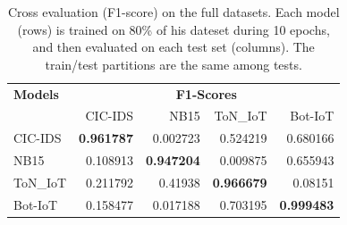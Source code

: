 \begin{table}[]
%
    \centering
    \begin{tabular}{l|rrrr}
        \toprule %
        \textbf{Models} & \multicolumn{4}{c}{\textbf{F1-Scores}} \\
                        & CIC-IDS & NB15 & ToN\_IoT & Bot-IoT \\
        \midrule %
          CIC-IDS & \textbf{0.961787} &    0.002723 &  0.524219 &  0.680166 \\
          NB15 & 0.108913 &    \textbf{0.947204} &  0.009875 &  0.655943 \\
          ToN\_IoT & 0.211792 &     0.41938 &  \textbf{0.966679} &   0.08151 \\
          Bot-IoT & 0.158477 &    0.017188 &  0.703195 &  \textbf{0.999483} \\
        \bottomrule %
    \end{tabular}
    \bigskip
    \caption{Cross evaluation (F1-score) on the full datasets.
    Each model (rows) is trained on 80\% of his dateset during 10 epochs, and then evaluated on each test set (columns).
    The train/test partitions are the same among tests.
    }
    \label{tbl:popoola_cross}
\end{table}
